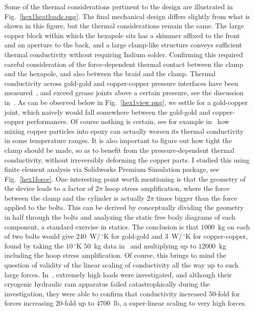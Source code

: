 Some of the thermal considerations pertinent to the design are illustrated in Fig.~\ref{hex1heatloads.png}.
The final mechanical design differs slightly from what is shown in this figure, but the thermal considerations remain the same.
The large copper block within which the hexapole sits has a skimmer affixed to the front and an aperture to the back, and a large clamp-like structure conveys sufficient thermal conductivity without requiring Indium solder.
Confirming this required careful consideration of the force-dependent thermal contact between the clamp and the hexapole, and also between the braid and the clamp.
Thermal conductivity across gold-gold and copper-copper pressure interfaces have been measured~\citep[Fig.~2.7]{Ekin2006}, and exceed grease joints above a certain pressure, see the discussion in~\citep[Sec.~2.6.4]{Ekin2006}.
As can be observed below in Fig.~\ref{hex1view.png}, we settle for a gold-copper joint, which naively would fall somewhere between the gold-gold and copper-copper performances.
Of course nothing is certain, see for example in~\citep[Fig.~5.8]{Hartwig2013} how mixing copper particles into epoxy can actually worsen its thermal conductivity in some temperature ranges.
It is also important to figure out how tight the clamp should be made, so as to benefit from the pressure-dependent thermal conductivity, without irreversibly deforming the copper parts.
I studied this using finite element analysis via Solidworks Premium Simulation package, see Fig.~\ref{hex1force}.
One interesting point worth mentioning is that the geometry of the device leads to a factor of $2\pi$ hoop stress amplification, where the force between the clamp and the cylinder is actually $2\pi$ times bigger than the force applied to the bolts.
This can be derived by conceptually dividing the geometry in half through the bolts and analyzing the static free body diagrams of each component, a standard exercise in statics.
The conclusion is that $1000$~kg on each of two bolts would give $240$~W/\,$^\circ$K for gold-gold and $3$~W/\,$^\circ$K for copper-copper, found by taking the $10\,^\circ$K $50$~kg data in~\citep[Fig.~5.8]{Hartwig2013} and multiplying up to $12000$~kg including the hoop stress amplification.
Of course, this brings to mind the question of validity of the linear scaling of conductivity all the way up to such large forces.
In~\cite{Berman1956}, extremely high loads were investigated, and although their cryogenic hydraulic ram apparatus failed catastrophically during the investigation, they were able to confirm that conductivity increased $5$0-fold for forces increasing $20$-fold up to $4700$~lb, a super-linear scaling to very high forces.

